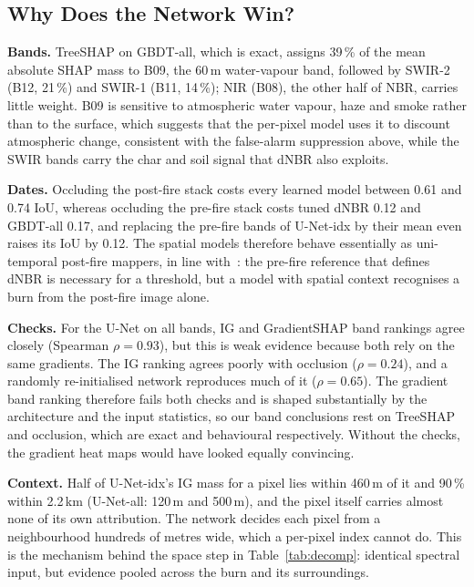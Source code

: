 \documentclass[conference]{IEEEtran}
\begin{document}
\subsection{Why Does the Network Win?}\label{sec:why}

\textbf{Bands.} TreeSHAP on GBDT-all, which is exact, assigns 39\,\% of the mean absolute SHAP mass to B09, the 60\,m water-vapour band, followed by SWIR-2 (B12, 21\,\%) and SWIR-1 (B11, 14\,\%); NIR (B08), the other half of NBR, carries little weight. B09 is sensitive to atmospheric water vapour, haze and smoke rather than to the surface, which suggests that the per-pixel model uses it to discount atmospheric change, consistent with the false-alarm suppression above, while the SWIR bands carry the char and soil signal that dNBR also exploits.

\textbf{Dates.} Occluding the post-fire stack costs every learned model between 0.61 and 0.74 IoU, whereas occluding the pre-fire stack costs tuned dNBR 0.12 and GBDT-all 0.17, and replacing the pre-fire bands of U-Net-idx by their mean even raises its IoU by 0.12. The spatial models therefore behave essentially as uni-temporal post-fire mappers, in line with~\cite{hu2021unitemporal}: the pre-fire reference that defines dNBR is necessary for a threshold, but a model with spatial context recognises a burn from the post-fire image alone.

\textbf{Checks.} For the U-Net on all bands, IG and GradientSHAP band rankings agree closely (Spearman $\rho=0.93$), but this is weak evidence because both rely on the same gradients. The IG ranking agrees poorly with occlusion ($\rho=0.24$), and a randomly re-initialised network reproduces much of it ($\rho=0.65$). The gradient band ranking therefore fails both checks and is shaped substantially by the architecture and the input statistics, so our band conclusions rest on TreeSHAP and occlusion, which are exact and behavioural respectively. Without the checks, the gradient heat maps would have looked equally convincing.

\textbf{Context.} Half of U-Net-idx's IG mass for a pixel lies within 460\,m of it and 90\,\% within 2.2\,km (U-Net-all: 120\,m and 500\,m), and the pixel itself carries almost none of its own attribution. The network decides each pixel from a neighbourhood hundreds of metres wide, which a per-pixel index cannot do. This is the mechanism behind the space step in Table~\ref{tab:decomp}: identical spectral input, but evidence pooled across the burn and its surroundings.
\end{document}
